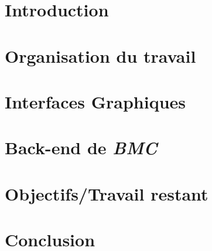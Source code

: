 \documentclass[a4paper
,oneside,11pt]{article}
\begin{document}
\section*{Introduction}\thispagestyle{fancy}



\section{Organisation du travail}


\section{Interfaces Graphiques}


\section{Back-end de \textit{BMC}}


\section{Objectifs/Travail restant}


\section*{Conclusion}\thispagestyle{fancy}



%
\end{document}
